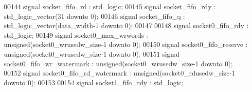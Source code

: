\begin{DoxyCode}
00144 \textcolor{keywordflow}{signal} \textcolor{vhdlchar}{socket_fifo_rd}       \textcolor{vhdlchar}{:} \textcolor{comment}{std\_logic};
00145 \textcolor{keywordflow}{signal} \textcolor{vhdlchar}{socket_fifo_rdy}      \textcolor{vhdlchar}{:} \textcolor{comment}{std\_logic\_vector}\textcolor{vhdlchar}{(}\textcolor{vhdllogic}{}\textcolor{vhdllogic}{31} \textcolor{keywordflow}{downto} \textcolor{vhdllogic}{}\textcolor{vhdllogic}{0}\textcolor{vhdlchar}{)};
00146 \textcolor{keywordflow}{signal} \textcolor{vhdlchar}{socket_fifo_q}            \textcolor{vhdlchar}{:} \textcolor{comment}{std\_logic\_vector}\textcolor{vhdlchar}{(}\textcolor{vhdlchar}{data_width}\textcolor{vhdlchar}{-}\textcolor{vhdllogic}{}\textcolor{vhdllogic}{1} \textcolor{keywordflow}{downto} \textcolor{vhdllogic}{}\textcolor{vhdllogic}{0}\textcolor{vhdlchar}{)};
00147 
00148 \textcolor{keywordflow}{signal} \textcolor{vhdlchar}{socket0_fifo_rdy}             \textcolor{vhdlchar}{:} \textcolor{comment}{std\_logic};
00149 \textcolor{keywordflow}{signal} \textcolor{vhdlchar}{socket0_max_wrwords}          \textcolor{vhdlchar}{:} \textcolor{comment}{unsigned}\textcolor{vhdlchar}{(}\textcolor{vhdlchar}{socket0_wrusedw_size}\textcolor{vhdlchar}{-}\textcolor{vhdllogic}{}\textcolor{vhdllogic}{1} \textcolor{keywordflow}{downto} \textcolor{vhdllogic}{}\textcolor{vhdllogic}{0}\textcolor{vhdlchar}{)};
00150 \textcolor{keywordflow}{signal} \textcolor{vhdlchar}{socket0_fifo_reserve}     \textcolor{vhdlchar}{:} \textcolor{comment}{unsigned}\textcolor{vhdlchar}{(}\textcolor{vhdlchar}{socket0_wrusedw_size}\textcolor{vhdlchar}{-}\textcolor{vhdllogic}{}\textcolor{vhdllogic}{1} \textcolor{keywordflow}{downto} \textcolor{vhdllogic}{}\textcolor{vhdllogic}{0}\textcolor{vhdlchar}{)};
00151 \textcolor{keywordflow}{signal} \textcolor{vhdlchar}{socket0_fifo_wr_watermark}    \textcolor{vhdlchar}{:} \textcolor{comment}{unsigned}\textcolor{vhdlchar}{(}\textcolor{vhdlchar}{socket0_wrusedw_size}\textcolor{vhdlchar}{-}\textcolor{vhdllogic}{}\textcolor{vhdllogic}{1} \textcolor{keywordflow}{downto} \textcolor{vhdllogic}{}\textcolor{vhdllogic}{0}\textcolor{vhdlchar}{)};
00152 \textcolor{keywordflow}{signal} \textcolor{vhdlchar}{socket0_fifo_rd_watermark}    \textcolor{vhdlchar}{:} \textcolor{comment}{unsigned}\textcolor{vhdlchar}{(}\textcolor{vhdlchar}{socket0_rdusedw_size}\textcolor{vhdlchar}{-}\textcolor{vhdllogic}{}\textcolor{vhdllogic}{1} \textcolor{keywordflow}{downto} \textcolor{vhdllogic}{}\textcolor{vhdllogic}{0}\textcolor{vhdlchar}{)};
00153 
00154 \textcolor{keywordflow}{signal} \textcolor{vhdlchar}{socket1_fifo_rdy}             \textcolor{vhdlchar}{:} \textcolor{comment}{std\_logic};

\end{DoxyCode}
